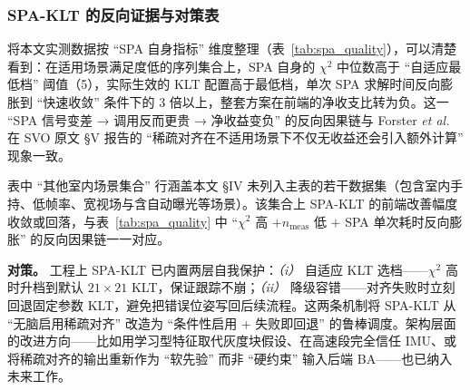 \documentclass[letterpaper,journal]{IEEEtran}
\begin{document}
\subsubsection{SPA-KLT 的反向证据与对策表}

将本文实测数据按 ``SPA 自身指标'' 维度整理（表~\ref{tab:spa_quality}），可以清楚看到：在适用场景满足度低的序列集合上，SPA 自身的 $\chi^2$ 中位数高于 ``自适应最低档'' 阈值（5），实际生效的 KLT 配置高于最低档，单次 SPA 求解时间反向膨胀到 ``快速收敛'' 条件下的 3 倍以上，整套方案在前端的净收支比转为负。这一 ``SPA 信号变差 → 调用反而更贵 → 净收益变负'' 的反向因果链与 Forster \textit{et al.} 在 SVO 原文 §V 报告的 ``稀疏对齐在不适用场景下不仅无收益还会引入额外计算'' 现象一致。

\begin{table}[!t]
\centering
\caption{SPA-KLT 自身指标在不同场景下的表现（同一份代码、不同数据集上的实测）。表中 ``适用吻合度'' 指上节 5 个条件的近似满足比例；$\chi^2$ 为单帧稀疏对齐残差中位数；$n_{\mathrm{meas}}$ 为单帧参与对齐的活跃测点数；SPA\_time 为单次对齐求解耗时。}
\label{tab:spa_quality}
\end{table}

表中 ``其他室内场景集合'' 行涵盖本文 §IV 未列入主表的若干数据集（包含室内手持、低帧率、宽视场与含自动曝光等场景）。该集合上 SPA-KLT 的前端改善幅度收敛或回落，与表~\ref{tab:spa_quality} 中 ``$\chi^2$ 高 $+ n_{\mathrm{meas}}$ 低 $+$ SPA 单次耗时反向膨胀'' 的反向因果链一一对应。

\textbf{对策。} 工程上 SPA-KLT 已内置两层自我保护：\textit{（i）} 自适应 KLT 选档——$\chi^2$ 高时升档到默认 $21{\times}21$ KLT，保证跟踪不崩；\textit{（ii）} 降级容错——对齐失败时立刻回退固定参数 KLT，避免把错误位姿写回后续流程。这两条机制将 SPA-KLT 从 ``无脑启用稀疏对齐'' 改造为 ``条件性启用 + 失败即回退'' 的鲁棒调度。架构层面的改进方向——比如用学习型特征取代灰度块假设、在高速段完全信任 IMU、或将稀疏对齐的输出重新作为 ``软先验'' 而非 ``硬约束'' 输入后端 BA——也已纳入未来工作。
\end{document}
